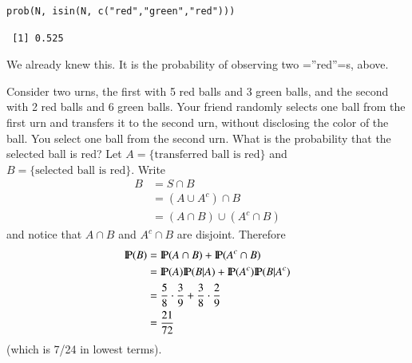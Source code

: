 \documentclass[captions=tableheading]{scrbook}
\begin{document}
\begin{verbatim}
prob(N, isin(N, c("red","green","red")))
\end{verbatim}

\begin{verbatim}
 [1] 0.525
\end{verbatim}

We already knew this. It is the probability of observing two =''red''=s, above.

\begin{example}
Consider two urns, the first with 5 red balls and 3 green balls, and the second with 2 red balls and 6 green balls. Your friend randomly selects one ball from the first urn and transfers it to the second urn, without disclosing the color of the ball. You select one ball from the second urn. What is the probability that the selected ball is red? Let \( A = \{ \mbox{transferred ball is red} \} \) and \( B = \{ \mbox{selected ball is red} \} \). Write
\begin{align*}
B & =S\cap B\\
 & =(A\cup A^{c})\cap B\\
 & =(A\cap B)\cup(A^{c}\cap B)
\end{align*}
and notice that \(A\cap B\) and \(A^{c}\cap B\) are disjoint. Therefore
\begin{align*}
\P(B) & =\P(A\cap B)+\P(A^{c}\cap B)\\
 & =\P(A)\P(B|A)+\P(A^{c})\P(B|A^{c})\\
 & =\frac{5}{8}\cdot\frac{3}{9}+\frac{3}{8}\cdot\frac{2}{9}\\
 & =\frac{21}{72}\ 
\end{align*}
(which is 7/24 in lowest terms).

\end{example}
\end{document}
